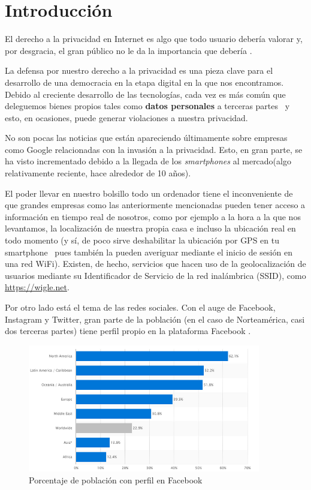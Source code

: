 \chapter{Introducción} 
\label{chap:intro}

\vspace{-0.2cm} 

El derecho a la privacidad en Internet es algo que todo usuario
debería valorar y, por desgracia, el gran público no le da
  la importancia que debería \cite{book:PrivacyBigDataPublicGood}.

La defensa por nuestro derecho a la privacidad es una pieza clave para el desarrollo de una democracia en la etapa digital en la que nos encontramos. Debido al creciente desarrollo de las tecnologías, cada vez es más común que deleguemos bienes propios tales como \textbf{datos personales} a terceras partes~\cite{paper:OECD} y esto, en ocasiones, puede generar violaciones a nuestra privacidad.

No son pocas las noticias que están apareciendo últimamente sobre
empresas como Google relacionadas con la invasión a la
privacidad. Esto, en gran parte, se ha visto incrementado debido a la
llegada de los \textit{smartphones} al mercado(algo relativamente
reciente, hace alrededor de 10 años). 

El poder llevar en nuestro bolsillo todo un ordenador tiene el inconveniente de que grandes empresas como las anteriormente mencionadas pueden tener acceso a
información en tiempo real de nosotros, como por ejemplo a la hora a
la que nos levantamos, la localización de nuestra propia casa e
incluso la ubicación real en todo momento (y sí, de poco sirve
deshabilitar la ubicación por GPS en tu smartphone~\cite{article:GPSTracking} pues también la
pueden averiguar mediante el inicio de sesión en una red WiFi). Existen, de hecho, servicios que hacen uso de la geolocalización de usuarios mediante su Identificador de Servicio de la red inalámbrica (SSID), como \url{https://wigle.net}.

Por otro lado está el tema de las redes sociales. Con el auge de
Facebook, Instagram y Twitter, gran parte de la población (en el caso
de Norteamérica, casi dos terceras partes) tiene perfil propio en la
plataforma Facebook .

\begin{figure}[!hbtp]
	\centerline{
		\mbox{\includegraphics[width=4.00in]{images/sn.png}}
	}
	\caption{Porcentaje de población con perfil en Facebook~\cite{article:FacebookStats} }
	\label{fig:FBStats}
\end{figure}

